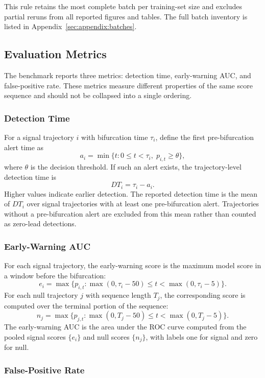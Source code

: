 This rule retains the most complete batch per training-set size and excludes
partial reruns from all reported figures and tables. The full batch inventory
is listed in Appendix~\ref{sec:appendix:batches}.

\subsection{Evaluation Metrics}
\label{sec:metrics}

The benchmark reports three metrics: detection time, early-warning AUC, and
false-positive rate. These metrics measure different properties of the same
score sequence and should not be collapsed into a single ordering.

\subsubsection{Detection Time}
\label{sec:metrics:dt}

For a signal trajectory \(i\) with bifurcation time \(\tau_i\), define the
first pre-bifurcation alert time as
\[
  a_i = \min \{t : 0 \leq t < \tau_i,\; p_{i,t} \geq \theta \},
\]
where \(\theta\) is the decision threshold. If such an alert exists, the
trajectory-level detection time is
\[
  DT_i = \tau_i - a_i.
\]
Higher values indicate earlier detection. The reported detection time is the
mean of \(DT_i\) over signal trajectories with at least one pre-bifurcation
alert. Trajectories without a pre-bifurcation alert are excluded from this
mean rather than counted as zero-lead detections.

\subsubsection{Early-Warning AUC}
\label{sec:metrics:auc}

For each signal trajectory, the early-warning score is the maximum model
score in a window before the bifurcation:
\[
  e_i = \max \{p_{i,t} : \max(0,\tau_i - 50) \leq t < \max(0,\tau_i - 5)\}.
\]
For each null trajectory \(j\) with sequence length \(T_j\), the
corresponding score is computed over the terminal portion of the sequence:
\[
  n_j = \max \{p_{j,t} : \max(0,T_j - 50) \leq t < \max(0,T_j - 5)\}.
\]
The early-warning AUC is the area under the ROC curve computed from the
pooled signal scores \(\{e_i\}\) and null scores \(\{n_j\}\), with labels
one for signal and zero for null.

\subsubsection{False-Positive Rate}
\label{sec:metrics:fpr}

